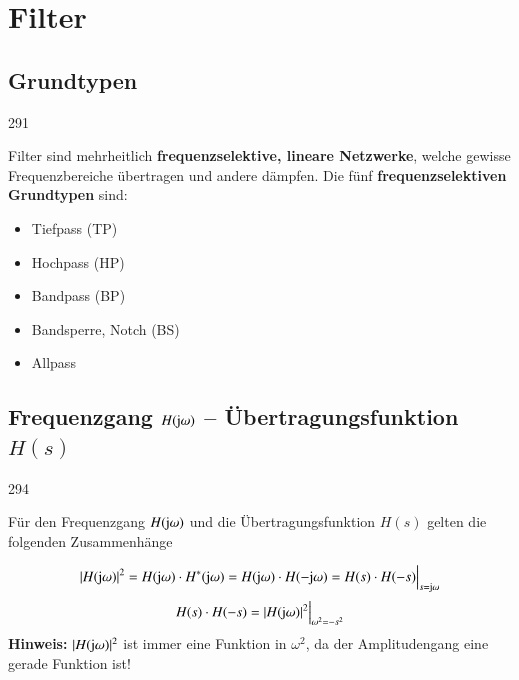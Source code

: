 \section{Filter}


\subsection{Grundtypen}{291}

Filter sind mehrheitlich \textbf{frequenzselektive, lineare Netzwerke}, welche gewisse Frequenzbereiche übertragen
und andere dämpfen. Die fünf \textbf{frequenzselektiven Grundtypen} sind: 

\begin{minipage}[t]{0.25\columnwidth}
    \begin{itemize}
        \item Tiefpass (TP)
        \item Hochpass (HP)
    \end{itemize}
\end{minipage}
\hfill
\begin{minipage}[t]{0.35\columnwidth}
    \begin{itemize}
        \item Bandpass (BP)
        \item Bandsperre, Notch (BS)
    \end{itemize}
\end{minipage}
\hfill
\begin{minipage}[t]{0.25\columnwidth}
    \begin{itemize}
        \item Allpass
    \end{itemize}
\end{minipage}


\subsection[Frequenzgang H(jimg omega) -- Übertragungsfunktion H(s)]{Frequenzgang $H(\mathrm{j} \omega)$ -- Übertragungsfunktion $H(s)$}{294}

Für den Frequenzgang $H(\mathrm{j} \omega)$ und die Übertragungsfunktion $H(s)$ gelten die folgenden Zusammenhänge

$$ | H(\mathrm{j} \omega) |^2 = H(\mathrm{j} \omega) \cdot H^*(\mathrm{j} \omega) = H(\mathrm{j} \omega) \cdot H(- \mathrm{j} \omega) = H(s) \cdot H(-s) \Big|_{s = \mathrm{j} \omega} $$
$$ H(s) \cdot H(-s) = | H(\mathrm{j} \omega) |^2 \Big|_{\omega^2 = -s^2} $$
\textbf{Hinweis:} $| H(\mathrm{j} \omega) |^2$ ist immer eine Funktion in $\omega^2$, da der Amplitudengang eine gerade Funktion ist!

